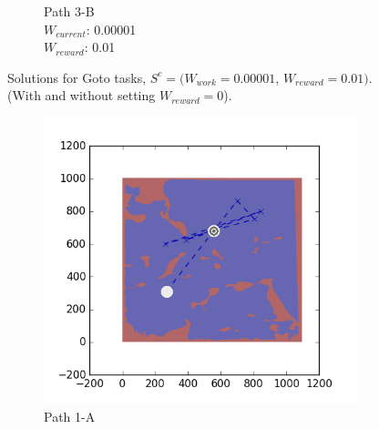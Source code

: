 \documentclass{tamuccthesis}
\begin{document}
\begin{figure}[H]
\begin{subfigure}[b]{0.24\textwidth}
        \caption{{\small Path 3-B \\ $W_{current}$: 0.00001 \\ $W_{reward}$: 0.01}}   
        \label{fig:Path_3-B_upReward_Work}
    \end{subfigure}
    \caption[Solutions for Goto tasks using weights $S^c$.]{Solutions for Goto tasks, $S^c = (W_{work} = 0.00001$, $W_{reward} = 0.01)$. \\ (With and without setting $W_{reward} = 0$).}
    \label{fig:weights_Sc}
\end{figure}

\begin{figure}[H]
    \centering
    \begin{subfigure}[b]{0.24\textwidth}
        \centering
            \includegraphics[width=\textwidth,trim={4cm 3cm 2cm 3cm},clip]{EXP3RG_PathAa_-1_-1_0d001_0d01.png}
        \caption{Path 1-A}    
        \label{fig:Path_1-A_upReward_upWork}
    \end{subfigure}
    \begin{subfigure}[b]{0.24\textwidth}  
        \centering 

\end{subfigure}
\end{figure}
\end{document}

